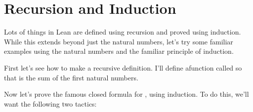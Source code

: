 \documentclass[letterpaper,10pt,english]{sphinxmanual}
\begin{document}
\begin{sphinxVerbatim}[commandchars=\\\{\}]
 
    
  \PYG{o}{[}  \PYG{o}{]}
    
             
     
\end{sphinxVerbatim}


\section{Recursion and Induction}
\label{\detokenize{day5:recursion-and-induction}}
\sphinxAtStartPar
Lots of things in Lean are defined using recursion and proved using induction.
While this extends beyond just the natural numbers,
let’s try some familiar examples using the natural numbers and the familiar principle of induction.

\sphinxAtStartPar
First let’s see how to make a recursive definition. I’ll define afunction called 
so that  is the sum of the first  natural numbers.

\begin{sphinxVerbatim}[commandchars=\\\{\}]
 
 

  
     
    
           
\end{sphinxVerbatim}

\sphinxAtStartPar
Now let’s prove the famous closed formula for , using induction.
To do this, we’ll want the following two tactics:
\end{document}
